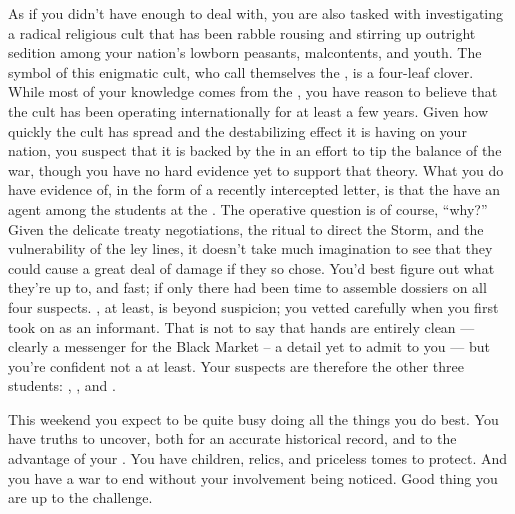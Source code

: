 \documentclass[char]{GL2020}
\begin{document}
As if you didn't have enough to deal with, you are also tasked with investigating a radical religious cult that has been rabble rousing and stirring up outright sedition among your nation's lowborn peasants, malcontents, and youth. The symbol of this enigmatic cult, who call themselves the \pGoaties{}, is a four-leaf clover. While most of your knowledge comes from the \pFarm{}, you have reason to believe that the cult has been operating internationally for at least a few years. Given how quickly the cult has spread and the destabilizing effect it is having on your nation, you suspect that it is backed by the \pShip{} in an effort to tip the balance of the war, though you have no hard evidence yet to support that theory. What you do have evidence of, in the form of a recently intercepted letter, is that the \pGoaties{} have an agent among the \pFarm{} students at the \pSchool{}. The operative question is of course, ``why?'' Given the delicate treaty negotiations, the ritual to direct the Storm, and the vulnerability of the ley lines, it doesn't take much imagination to see that they could cause a great deal of damage if they so chose. You'd best figure out what they're up to, and fast; if only there had been time to assemble dossiers on all four suspects. \cLibAssist{}, at least, is beyond suspicion; you vetted \cLibAssist{\them} carefully when you first took \cLibAssist{\them} on as an informant. That is not to say that \cLibAssist{\their} hands are entirely clean — \cLibAssist{\theyare} clearly a messenger for the Black Market -- a detail \cLibAssist{\they} \cLibAssist{\have} yet to admit to you — but you're confident \cLibAssist{\theyare} not a \pGoatie{} at least. Your suspects are therefore the other three \pFarm{} students: \cChupStudent{\full}, \cAdopted{\full}, and \cDisney{\full}.

This weekend you expect to be quite busy doing all the things you do best. You have truths to uncover, both for an accurate historical record, and to the advantage of your \cQueen{\Majesty}. You have children, relics, and priceless tomes to protect. And you have a war to end without your involvement being noticed. Good thing you are up to the challenge.
\end{document}
